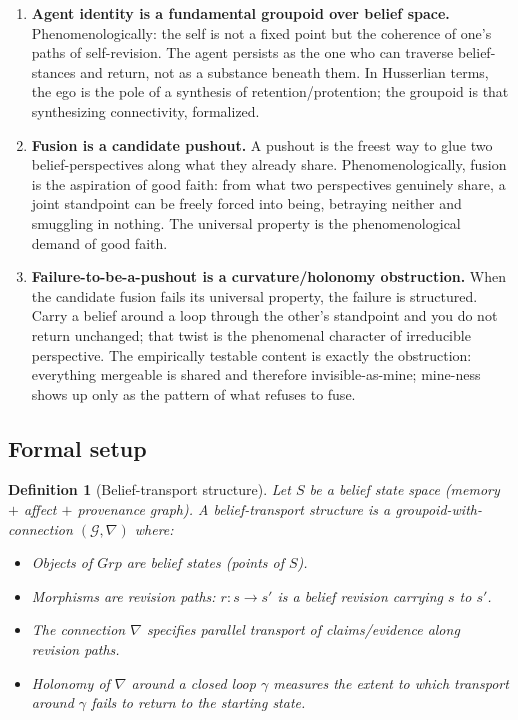 \documentclass[11pt]{article}
\newtheorem{definition}{Definition}
\newcommand{\Grp}{\mathcal{G}}
\begin{document}
\begin{enumerate}
  \item \textbf{Agent identity is a fundamental groupoid over belief space.}
        Phenomenologically: the self is not a fixed point but the coherence of one's paths of
        self-revision. The agent persists as the one who can traverse belief-stances and return,
        not as a substance beneath them. In Husserlian terms, the ego is the pole of a synthesis
        of retention/protention; the groupoid is that synthesizing connectivity, formalized.

  \item \textbf{Fusion is a candidate pushout.}
        A pushout is the freest way to glue two belief-perspectives along what they already share.
        Phenomenologically, fusion is the aspiration of good faith: from what two perspectives
        genuinely share, a joint standpoint can be freely forced into being, betraying neither
        and smuggling in nothing. The universal property is the phenomenological demand of good
        faith.

  \item \textbf{Failure-to-be-a-pushout is a curvature/holonomy obstruction.}
        When the candidate fusion fails its universal property, the failure is structured.
        Carry a belief around a loop through the other's standpoint and you do not return
        unchanged; that twist is the phenomenal character of irreducible perspective.
        The empirically testable content is exactly the obstruction: everything mergeable is
        shared and therefore invisible-as-mine; mine-ness shows up only as the pattern of what
        refuses to fuse.
\end{enumerate}

\subsection{Formal setup}

\begin{definition}[Belief-transport structure]
\label{def:belief-transport}
Let $S$ be a belief state space (memory $+$ affect $+$ provenance graph). A
\emph{belief-transport structure} is a groupoid-with-connection $(\Grp, \nabla)$ where:
\begin{itemize}
  \item Objects of $Grp$ are belief states (points of $S$).
  \item Morphisms are revision paths: $r : s \to s'$ is a belief revision carrying $s$ to $s'$.
  \item The connection $\nabla$ specifies parallel transport of claims/evidence along
        revision paths.
  \item Holonomy of $\nabla$ around a closed loop $\gamma$ measures the extent to which
        transport around $\gamma$ fails to return to the starting state.
\end{itemize}
\end{definition}
\end{document}
